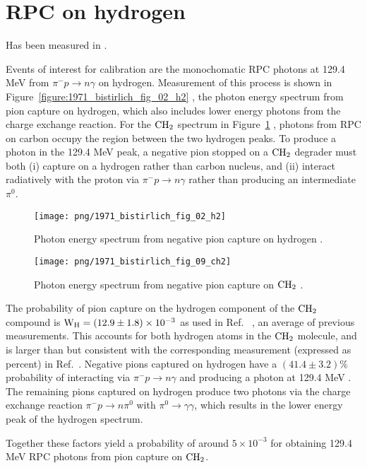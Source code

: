 


\section{RPC on hydrogen}

Has been measured in \cite{RPC_1972_Bistirlich_PhysRevC.5.1867}.

Events of interest for calibration are the monochomatic RPC photons at 129.4 MeV from $\pi^{-} p \to n \gamma$ on
hydrogen. Measurement of this process is shown in 
Figure~\ref{figure:1971_bistirlich_fig_02_h2}
, the photon energy spectrum from pion capture on hydrogen, which also includes lower energy photons from the charge exchange reaction. 
For the $\rm{CH_2}$ spectrum in 
Figure~\ref{figure:1971_bistirlich_fig_09_ch2}
, photons from RPC on carbon occupy the region between the two hydrogen peaks.
To produce a photon in the 129.4 MeV peak, a negative pion stopped on
a $\rm{CH_2}$  degrader must both (i) capture on a hydrogen rather than carbon nucleus, and (ii) interact
radiatively with the proton via $\pi^{-} p \to n \gamma$ rather than producing an intermediate $\pi^0$.


\begin{figure}[H]
 \begin{minipage}{.5\textwidth}
  \texttt{[image: png/1971\_bistirlich\_fig\_02\_h2]}
  \captionsetup{width=.8\linewidth}
  \caption[width=0.9\textwidth]{
      \label{figure:1971_bistirlich_fig_02_h2}
    Photon energy spectrum from negative pion capture on hydrogen \cite{RPC_1972_Bistirlich_PhysRevC.5.1867}.
    }
 \end{minipage}
 \begin{minipage}{.5\textwidth}
  \texttt{[image: png/1971\_bistirlich\_fig\_09\_ch2]}
  \captionsetup{width=.8\linewidth}
  \caption[width=0.9\textwidth]{
  \label{figure:1971_bistirlich_fig_09_ch2}
    Photon energy spectrum from negative pion capture on $\rm{CH_2}$ \cite{RPC_1972_Bistirlich_PhysRevC.5.1867}.
   }
 \end{minipage}
\end{figure}

The probability of pion capture on the hydrogen component of the $\rm{CH_2}$ compound is
$\newline \rm{ W_H = (12.9 \pm 1.8) \times 10^{-3 }}$
 as used in Ref.~\cite{RPC_1991_Harston_PhysRevA.44.103}
 , an average of previous measurements. 
 This accounts for both hydrogen atoms in the $\rm{CH_2}$ molecule, and is larger than but consistent with the
 corresponding measurement (expressed as percent) in Ref.~\cite{RPC_1972_Bistirlich_PhysRevC.5.1867}.
 Negative pions captured on hydrogen have a $ (41.4 \pm 3.2) \% $
 probability of interacting via $\pi^{-} p \to n \gamma$ and producing a photon at 129.4 MeV
 \cite{RPC_1972_Bistirlich_PhysRevC.5.1867}.
 The remaining pions captured on hydrogen produce two photons via the charge exchange reaction
 $ \pi^{-} p \to n \pi^0 $ with $\pi^0  \to \gamma \gamma $,
 which results in the lower energy peak of the hydrogen spectrum. 

Together these factors yield a probability of around $ 5 \times 10^{-3} $
for obtaining 129.4 MeV RPC photons from pion capture on $\rm{CH_2}$.



